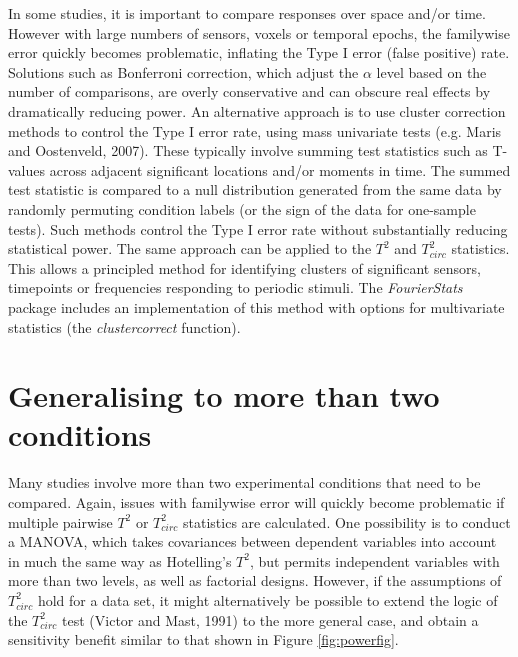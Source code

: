 \documentclass[]{article}
\begin{document}
In some studies, it is important to compare responses over space and/or time. However with large numbers of sensors, voxels or temporal epochs, the familywise error quickly becomes problematic, inflating the Type I error (false positive) rate. Solutions such as Bonferroni correction, which adjust the \(\alpha\) level based on the number of comparisons, are overly conservative and can obscure real effects by dramatically reducing power. An alternative approach is to use cluster correction methods to control the Type I error rate, using mass univariate tests (e.g. Maris and Oostenveld, 2007). These typically involve summing test statistics such as T-values across adjacent significant locations and/or moments in time. The summed test statistic is compared to a null distribution generated from the same data by randomly permuting condition labels (or the sign of the data for one-sample tests). Such methods control the Type I error rate without substantially reducing statistical power. The same approach can be applied to the \(T^2\) and \(T^2_{circ}\) statistics. This allows a principled method for identifying clusters of significant sensors, timepoints or frequencies responding to periodic stimuli. The \emph{FourierStats} package includes an implementation of this method with options for multivariate statistics (the \emph{clustercorrect} function).

\hypertarget{generalising-to-more-than-two-conditions}{%
\section{Generalising to more than two conditions}\label{generalising-to-more-than-two-conditions}}

Many studies involve more than two experimental conditions that need to be compared. Again, issues with familywise error will quickly become problematic if multiple pairwise \(T^2\) or \(T^2_{circ}\) statistics are calculated. One possibility is to conduct a MANOVA, which takes covariances between dependent variables into account in much the same way as Hotelling's \(T^2\), but permits independent variables with more than two levels, as well as factorial designs. However, if the assumptions of \(T^2_{circ}\) hold for a data set, it might alternatively be possible to extend the logic of the \(T^2_{circ}\) test (Victor and Mast, 1991) to the more general case, and obtain a sensitivity benefit similar to that shown in Figure \ref{fig:powerfig}.
\end{document}
